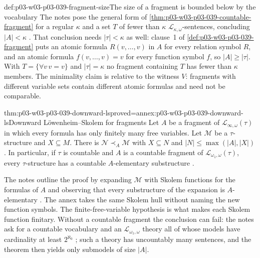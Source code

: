 \begin{hbwarning}{def:p03-w03-p03-039-fragment-size}{The size of a fragment is bounded below by the vocabulary}
The notes pose the general form of \cref{thm:p03-w03-p03-039-countable-fragment}
for a regular \(\kappa\) and a set \(T\) of fewer than \(\kappa\)
\(\mathcal L_{\kappa,\omega}\)-sentences, concluding \(\lvert A\rvert<\kappa\)
\cite[Ex.~1.19(a), p.~9]{Marker2014InfinitaryNotes}. That conclusion needs
\(\lvert\tau\rvert<\kappa\) as well: clause~1 of
\cref{def:p03-w03-p03-039-fragment} puts an atomic formula
\(R(v,\ldots,v)\) in \(A\) for every relation symbol \(R\), and an atomic
formula \(f(v,\ldots,v)=v\) for every function symbol \(f\), so
\(\lvert A\rvert\ge\lvert\tau\rvert\). With \(T=\{\forall v\,v=v\}\) and
\(\lvert\tau\rvert=\kappa\) no fragment containing \(T\) has fewer than
\(\kappa\) members. The minimality claim is relative to the witness \(V\):
fragments with different variable sets contain different atomic formulas and
need not be comparable.
\end{hbwarning}

\begin{hbtheorem}{thm:p03-w03-p03-039-downward-ls}{proved=annex:p03-w03-p03-039-downward-ls}{Downward L\"owenheim--Skolem for fragments}
Let \(A\) be a fragment of \(\mathcal L_{\infty,\omega}(\tau)\) in which every
formula has only finitely many free variables. Let \(\mathcal M\) be a
\(\tau\)-structure and \(X\subseteq M\). There is
\(\mathcal N\prec_A\mathcal M\) with \(X\subseteq N\) and
\(\lvert N\rvert\le\max(\lvert A\rvert,\lvert X\rvert)\). In particular, if
\(\tau\) is countable and \(A\) is a countable fragment of
\(\mathcal L_{\omega_1,\omega}(\tau)\), every \(\tau\)-structure has a
countable \(A\)-elementary substructure
\cite[Thm.~1.23, p.~10]{Marker2014InfinitaryNotes}.
\end{hbtheorem}

The notes outline the proof by expanding \(\mathcal M\) with Skolem functions
for the formulas of \(A\) and observing that every substructure of the
expansion is \(A\)-elementary \cite[Ex.~1.24, p.~10]{Marker2014InfinitaryNotes}.
The annex takes the same Skolem hull without naming the new function
symbols. The finite-free-variable hypothesis is what makes each Skolem
function finitary. Without a countable fragment the conclusion can fail: the
notes ask for a countable vocabulary and an \(\mathcal L_{\omega_1,\omega}\)
theory all of whose models have cardinality at least \(2^{\aleph_0}\)
\cite[Ex.~1.15, p.~8]{Marker2014InfinitaryNotes}; such a theory has
uncountably many sentences, and the theorem then yields only submodels of
size \(\lvert A\rvert\).

